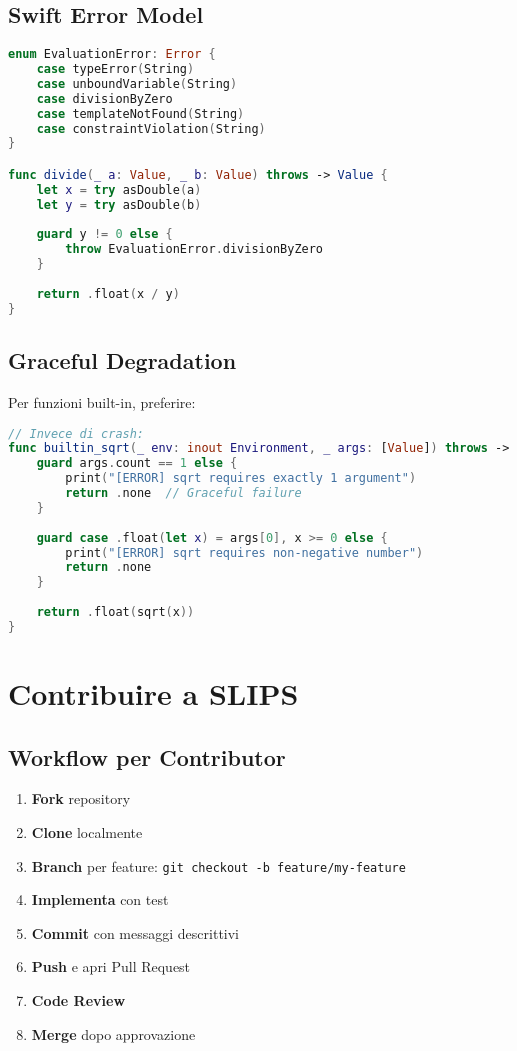 \subsection{Swift Error Model}

\begin{lstlisting}[language=Swift]
enum EvaluationError: Error {
    case typeError(String)
    case unboundVariable(String)
    case divisionByZero
    case templateNotFound(String)
    case constraintViolation(String)
}

func divide(_ a: Value, _ b: Value) throws -> Value {
    let x = try asDouble(a)
    let y = try asDouble(b)
    
    guard y != 0 else {
        throw EvaluationError.divisionByZero
    }
    
    return .float(x / y)
}
\end{lstlisting}

\subsection{Graceful Degradation}

Per funzioni built-in, preferire:

\begin{lstlisting}[language=Swift]
// Invece di crash:
func builtin_sqrt(_ env: inout Environment, _ args: [Value]) throws -> Value {
    guard args.count == 1 else {
        print("[ERROR] sqrt requires exactly 1 argument")
        return .none  // Graceful failure
    }
    
    guard case .float(let x) = args[0], x >= 0 else {
        print("[ERROR] sqrt requires non-negative number")
        return .none
    }
    
    return .float(sqrt(x))
}
\end{lstlisting}

\section{Contribuire a SLIPS}

\subsection{Workflow per Contributor}

\begin{enumerate}
\item \textbf{Fork} repository
\item \textbf{Clone} localmente
\item \textbf{Branch} per feature: \texttt{git checkout -b feature/my-feature}
\item \textbf{Implementa} con test
\item \textbf{Commit} con messaggi descrittivi
\item \textbf{Push} e apri Pull Request
\item \textbf{Code Review}
\item \textbf{Merge} dopo approvazione
\end{enumerate}

